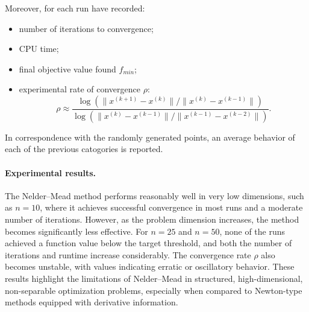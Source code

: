 \documentclass[a4paper,12pt]{article}
\begin{document}
	Moreover, for each run have recorded:
	\begin{itemize}
		\item number of iterations to convergence;
		\item CPU time;
		\item final objective value found \(f_{min}\);
		\item experimental rate of convergence \(\rho\):
		\[
		\rho \approx \frac{\log\left(\|x^{(k+1)} - x^{(k)}\|\big/\|x^{(k)} - x^{(k-1)}\|\right)}{\log\left(\|x^{(k)} - x^{(k-1)}\|\big/\|x^{(k-1)} - x^{(k-2)}\|\right)}.
		\]
			\end{itemize}	
	
	In correspondence with the randomly generated points, an average behavior of each of the previous catogories is reported.
	
	\begin{table}[H]
		\renewcommand{\arraystretch}{1.2}
		\caption{Results of Nelder–Mead on Generalized Broyden tridiagonal function.}
		\label{tab:nelder_broyden}
	\end{table}


\paragraph{Experimental results.}

	The Nelder–Mead method performs reasonably well in very low dimensions, such as $n = 10$, where it achieves successful convergence in most runs and a moderate number of iterations. However, as the problem dimension increases, the method becomes significantly less effective. For $n = 25$ and $n = 50$, none of the runs achieved a function value below the target threshold, and both the number of iterations and runtime increase considerably. The convergence rate $\rho$ also becomes unstable, with values indicating erratic or oscillatory behavior. These results highlight the limitations of Nelder–Mead in structured, high-dimensional, non-separable optimization problems, especially when compared to Newton-type methods equipped with derivative information.
	
\end{document}
